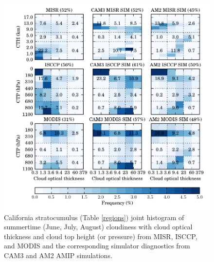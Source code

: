 \begin{figure}
    \centering
    \includegraphics{../graphics/hist2d_cmip3amip_hawaiian.pdf}
    \caption[Hawaiian trade cumulus joint histogram of summertime cloudiness with cloud optical thickness and cloud top height from MISR, ISCCP, and MODIS and the corresponding simulator diagnostics from CAM3 and AM2 AMIP simulations.]{California stratocumulus (Table \ref{regions}) joint histogram of summertime (June, July, August) cloudiness with cloud optical thickness and cloud top height (or pressure) from MISR, ISCCP, and MODIS and the corresponding simulator diagnostics from CAM3 and AM2 AMIP simulations.}
    \label{hist2d_cmip3amip_hawaiian}
\end{figure}


